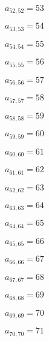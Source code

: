 \documentclass[a4paper,12pt]{article}
\begin{document}
$a _{ 52, 52 } = 53$

$a _{ 53, 53 } = 54$

$a _{ 54, 54 } = 55$

$a _{ 55, 55 } = 56$

$a _{ 56, 56 } = 57$

$a _{ 57, 57 } = 58$

$a _{ 58, 58 } = 59$

$a _{ 59, 59 } = 60$

$a _{ 60, 60 } = 61$

$a _{ 61, 61 } = 62$

$a _{ 62, 62 } = 63$

$a _{ 63, 63 } = 64$

$a _{ 64, 64 } = 65$

$a _{ 65, 65 } = 66$

$a _{ 66, 66 } = 67$

$a _{ 67, 67 } = 68$

$a _{ 68, 68 } = 69$

$a _{ 69, 69 } = 70$

$a _{ 70, 70 } = 71$
\end{document}
